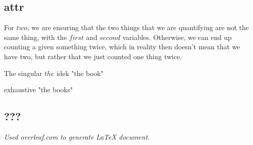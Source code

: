 \documentclass[12pt, letterpaper]{article}
\begin{document}
\subsection{attr}


For $two$, we are ensuring that the two things that we are quantifying are not the same thing, with the $first$ and $second$ variables. Otherwise, we can end up counting a given something twice, which in reality then doesn't mean that we have two, but rather that we just counted one thing twice. 


The singular $the$ idek
"the book"

exhaustive 
"the books"

\subsection{???}

\begin{center}
\textit{Used overleaf.com to generate LaTeX document.}
\end{center}
\end{document}
